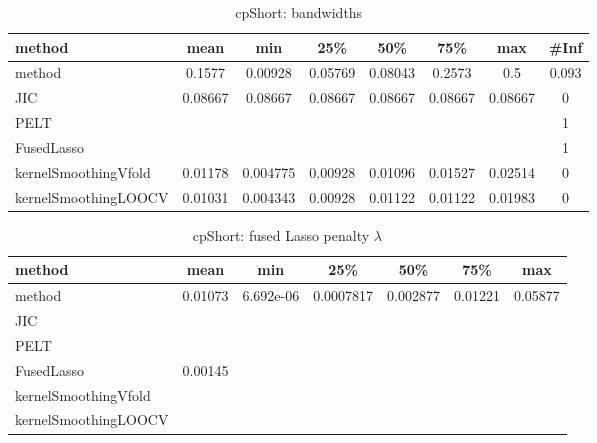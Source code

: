 \begin{table}[ht]
\centering
\begin{tabular}{l|c|ccccc|c}
  \hline
method & mean & min & 25\% & 50\% & 75\% & max & \#Inf \\ 
  \hline
method & 0.1577 & 0.00928 & 0.05769 & 0.08043 & 0.2573 &   0.5 & 0.093 \\ 
  JIC & 0.08667 & 0.08667 & 0.08667 & 0.08667 & 0.08667 & 0.08667 &   0 \\ 
  PELT &  &  &  &  &  &  &   1 \\ 
  FusedLasso &  &  &  &  &  &  &   1 \\ 
  kernelSmoothingVfold & 0.01178 & 0.004775 & 0.00928 & 0.01096 & 0.01527 & 0.02514 &   0 \\ 
  kernelSmoothingLOOCV & 0.01031 & 0.004343 & 0.00928 & 0.01122 & 0.01122 & 0.01983 &   0 \\ 
   \hline
\end{tabular}
\caption{cpShort: bandwidths} 
\label{tab:cpShortBandwidths}
\end{table}
\begin{table}[ht]
\centering
\begin{tabular}{l|c|ccccc}
  \hline
method & mean & min & 25\% & 50\% & 75\% & max \\ 
  \hline
method & 0.01073 & 6.692e-06 & 0.0007817 & 0.002877 & 0.01221 & 0.05877 \\ 
  JIC &  &  &  &  &  &  \\ 
  PELT &  &  &  &  &  &  \\ 
  FusedLasso & 0.00145 &  &  &  &  &  \\ 
  kernelSmoothingVfold &  &  &  &  &  &  \\ 
  kernelSmoothingLOOCV &  &  &  &  &  &  \\ 
   \hline
\end{tabular}
\caption{cpShort: fused Lasso penalty $\lambda$} 
\label{tab:cpShortLambdas}
\end{table}
